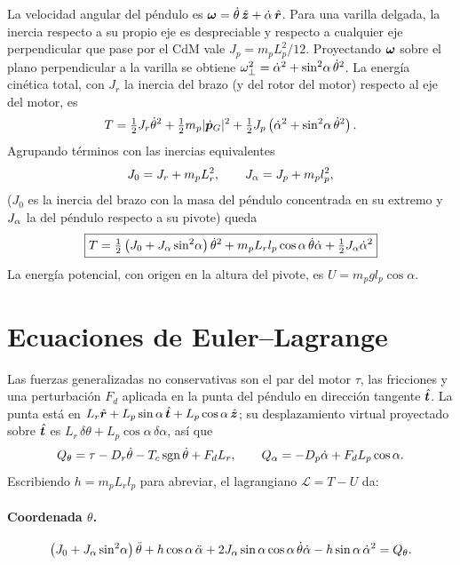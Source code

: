 La velocidad angular del péndulo es $\bm{\omega}=\dot{\theta}\,\hat{\bm{z}}+\dot{\alpha}\,\hat{\bm{r}}$. Para una varilla delgada, la inercia respecto a su propio eje es despreciable y respecto a cualquier eje perpendicular que pase por el CdM vale $J_p=m_pL_p^2/12$. Proyectando $\bm{\omega}$ sobre el plano perpendicular a la varilla se obtiene $\omega_\perp^2=\dot{\alpha}^2+\sin^2\!\alpha\,\dot{\theta}^2$. La energía cinética total, con $J_r$ la inercia del brazo (y del rotor del motor) respecto al eje del motor, es
\begin{equation}
  T = \tfrac12 J_r\dot{\theta}^2 + \tfrac12 m_p|\dot{\bm{p}}_G|^2 + \tfrac12 J_p\left(\dot{\alpha}^2+\sin^2\!\alpha\,\dot{\theta}^2\right).
\end{equation}
Agrupando términos con las inercias equivalentes
\begin{equation}
  J_0 = J_r + m_pL_r^2, \qquad J_\alpha = J_p + m_pl_p^2,
  \label{eq:inercias}
\end{equation}
($J_0$ es la inercia del brazo con la masa del péndulo concentrada en su extremo y $J_\alpha$ la del péndulo respecto a su pivote) queda
\begin{equation}
  \boxed{T = \tfrac12\left(J_0+J_\alpha\sin^2\!\alpha\right)\dot{\theta}^2 + m_pL_rl_p\cos\alpha\,\dot{\theta}\dot{\alpha} + \tfrac12J_\alpha\dot{\alpha}^2}
  \label{eq:T}
\end{equation}
La energía potencial, con origen en la altura del pivote, es $U=m_pgl_p\cos\alpha$.

\section{Ecuaciones de Euler--Lagrange}

Las fuerzas generalizadas no conservativas son el par del motor $\tau$, las fricciones y una perturbación $F_d$ aplicada en la punta del péndulo en dirección tangente $\hat{\bm{t}}$. La punta está en $L_r\hat{\bm{r}}+L_p\sin\alpha\,\hat{\bm{t}}+L_p\cos\alpha\,\hat{\bm{z}}$; su desplazamiento virtual proyectado sobre $\hat{\bm{t}}$ es $L_r\,\delta\theta + L_p\cos\alpha\,\delta\alpha$, así que
\begin{equation}
  Q_\theta = \tau - D_r\dot{\theta} - T_c\operatorname{sgn}\dot{\theta} + F_dL_r,\qquad
  Q_\alpha = -D_p\dot{\alpha} + F_dL_p\cos\alpha .
\end{equation}
Escribiendo $h=m_pL_rl_p$ para abreviar, el lagrangiano $\mathcal L=T-U$ da:

\paragraph{Coordenada $\theta$.}
\begin{equation}
  \left(J_0+J_\alpha\sin^2\!\alpha\right)\ddot{\theta} + h\cos\alpha\,\ddot{\alpha} + 2J_\alpha\sin\alpha\cos\alpha\,\dot{\theta}\dot{\alpha} - h\sin\alpha\,\dot{\alpha}^2 = Q_\theta .
  \label{eq:el1}
\end{equation}

